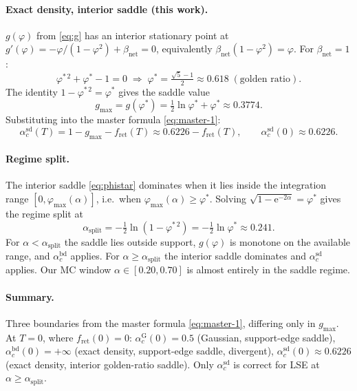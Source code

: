 \documentclass[11pt]{article}
\newcommand{\e}{{\mathrm{e}}}
\newcommand{\Bnet}{\beta_{\mathrm{net}}}
\newcommand{\fret}{f_{\mathrm{ret}}}
\newcommand{\acGauss}{\alpha_c^{\mathrm{G}}}
\newcommand{\acBd}{\alpha_c^{\mathrm{bd}}}
\newcommand{\acSd}{\alpha_c^{\mathrm{sd}}}
\begin{document}
\paragraph{Exact density, interior saddle (this work).}
$g(\varphi)$ from \eqref{eq:g} has an interior stationary point at
$g'(\varphi) = -\varphi/(1 - \varphi^2) + \Bnet = 0$,
equivalently $\Bnet(1 - \varphi^2) = \varphi$.  For $\Bnet = 1$:
\begin{equation}
\varphi^{*\,2} + \varphi^{*} - 1 = 0
\;\Longrightarrow\;
\varphi^{*} = \tfrac{\sqrt 5 - 1}{2} \approx 0.618
\;(\text{golden ratio}).
\label{eq:phistar}
\end{equation}
The identity $1 - \varphi^{*\,2} = \varphi^{*}$ gives the saddle value
\begin{equation}
g_{\max} = g(\varphi^{*})
        = \tfrac12 \ln \varphi^{*} + \varphi^{*}
        \approx 0.3774.
\label{eq:gmax}
\end{equation}
Substituting into the master formula \eqref{eq:master-1}:
\begin{equation}
\boxed{\;
\acSd(T) = 1 - g_{\max} - \fret(T) \approx 0.6226 - \fret(T),
\qquad \acSd(0) \approx 0.6226.
\;}
\label{eq:acsd}
\end{equation}

\paragraph{Regime split.}
The interior saddle \eqref{eq:phistar} dominates when it lies inside
the integration range $[0, \varphi_{\max}(\alpha)]$, i.e.\ when
$\varphi_{\max}(\alpha) \geq \varphi^{*}$.  Solving
$\sqrt{1 - \e^{-2\alpha}} = \varphi^{*}$ gives the regime split at
\begin{equation}
\alpha_{\mathrm{split}}
   = -\tfrac12 \ln(1 - \varphi^{*\,2})
   = -\tfrac12 \ln \varphi^{*}
   \approx 0.241.
\label{eq:alpha-split}
\end{equation}
For $\alpha < \alpha_{\mathrm{split}}$ the saddle lies outside support,
$g(\varphi)$ is monotone on the available range, and $\acBd$ applies.
For $\alpha \geq \alpha_{\mathrm{split}}$ the interior saddle dominates
and $\acSd$ applies.  Our MC window $\alpha \in [0.20, 0.70]$ is
almost entirely in the saddle regime.

\paragraph{Summary.}
Three boundaries from the master formula \eqref{eq:master-1},
differing only in $g_{\max}$.  At $T = 0$, where $\fret(0) = 0$:
$\acGauss(0) = 0.5$ (Gaussian, support-edge saddle),
$\acBd(0) = +\infty$ (exact density, support-edge saddle, divergent),
$\acSd(0) \approx 0.6226$ (exact density, interior golden-ratio
saddle).  Only $\acSd$ is correct for LSE at
$\alpha \geq \alpha_{\mathrm{split}}$.
\end{document}
